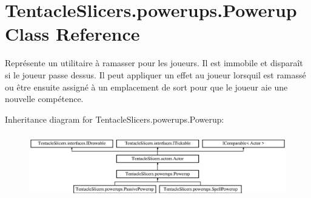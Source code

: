 \hypertarget{class_tentacle_slicers_1_1powerups_1_1_powerup}{}\section{Tentacle\+Slicers.\+powerups.\+Powerup Class Reference}
\label{class_tentacle_slicers_1_1powerups_1_1_powerup}


Représente un utilitaire à ramasser pour les joueurs. Il est immobile et disparaît si le joueur passe dessus. Il peut appliquer un effet au joueur lorsqu\textquotesingle{}il est ramassé ou être ensuite assigné à un emplacement de sort pour que le joueur aie une nouvelle compétence.  


Inheritance diagram for Tentacle\+Slicers.\+powerups.\+Powerup\+:\begin{figure}[H]
\begin{center}
\leavevmode
\includegraphics[height=2.828283cm]{class_tentacle_slicers_1_1powerups_1_1_powerup}
\end{center}
\end{figure}
